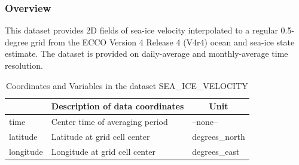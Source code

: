 \subsubsection{Overview}
This dataset provides 2D fields of sea-ice velocity interpolated to a regular 0.5-degree grid from the ECCO Version 4 Release 4 (V4r4) ocean and sea-ice state estimate. The dataset is provided on daily-average and monthly-average time resolution. 
\begin{longtable}{|m{}|m{}|m{}|}
\caption{Coordinates and Variables in the dataset SEA\_ICE\_VELOCITY}
\label{tab:table-<xarray.Dataset> Size: 2MB
Dimensions:         (time: 1, latitude: 360, longitude: 720, nv: 2)
Coordinates:
  * time            (time) datetime64[ns] 8B 2017-12-29T12:00:00
  * latitude        (latitude) float32 1kB -89.75 -89.25 -88.75 ... 89.25 89.75
  * longitude       (longitude) float32 3kB -179.8 -179.2 -178.8 ... 179.2 179.8
    time_bnds       (time, nv) datetime64[ns] 16B ...
    latitude_bnds   (latitude, nv) float32 3kB ...
    longitude_bnds  (longitude, nv) float32 6kB ...
Dimensions without coordinates: nv
Data variables:
    SIeice          (time, latitude, longitude) float32 1MB ...
    SInice          (time, latitude, longitude) float32 1MB ...
Attributes: (12/57)
    acknowledgement:              This research was carried out by the Jet Pr...
    author:                       Ian Fenty and Ou Wang
    cdm_data_type:                Grid
    comment:                      Fields provided on a regular lat-lon grid. ...
    Conventions:                  CF-1.8, ACDD-1.3
    coordinates_comment:          Note: the global 'coordinates' attribute de...
    ...                           ...
    time_coverage_duration:       P1D
    time_coverage_end:            2017-12-30T00:00:00
    time_coverage_resolution:     P1D
    time_coverage_start:          2017-12-29T00:00:00
    title:                        ECCO Sea-Ice Velocity - Daily Mean 0.5 Degr...
    uuid:                         6eec0474-4054-11eb-bf71-0cc47a3f7fed-fields} \\ 
\hline \endhead \hline \endfoot
\rowcolor{lightgray} \multicolumn{1}{|c|}{\textbf{Coordinates}} & \multicolumn{1}{|c|}{\textbf{Description of data coordinates}} &  \multicolumn{1}{|c|}{\textbf{Unit}}\\ \hline
time &Center time of averaging period &--none--  \\ \hline
latitude &Latitude at grid cell center &degrees\_north  \\ \hline
longitude &Longitude at grid cell center &degrees\_east  \\ \hline

\end{longtable}
